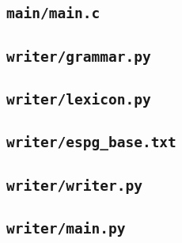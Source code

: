 \documentclass[../main.tex]{subfiles}
\begin{document}
\subsection{\texttt{main/main.c}}


\subsection{\texttt{writer/grammar.py}}


\subsection{\texttt{writer/lexicon.py}}


\subsection{\texttt{writer/espg\_base.txt}}


\subsection{\texttt{writer/writer.py}}


\subsection{\texttt{writer/main.py}}

\end{document}

